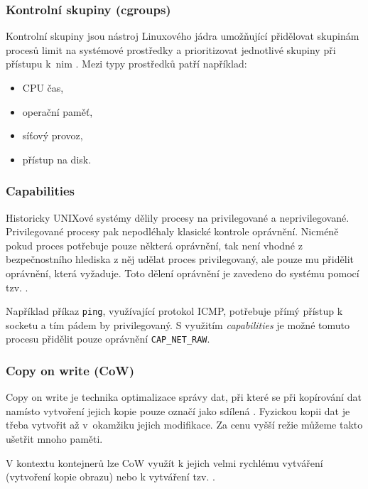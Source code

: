 \subsubsection{Kontrolní skupiny (cgroups)}

Kontrolní skupiny jsou nástroj Linuxového jádra umožňující přidělovat skupinám procesů limit na systémové prostředky a prioritizovat jednotlivé skupiny při přístupu k~nim \cite{cgroups}.
Mezi typy prostředků patří například:

\begin{itemize}
	\item CPU čas,
	\item operační paměť,
	\item síťový provoz,
	\item přístup na disk.
\end{itemize} %

\subsubsection{Capabilities}

Historicky UNIXové systémy dělily procesy na privilegované a neprivilegované.
Privilegované procesy pak nepodléhaly klasické kontrole oprávnění.
Nicméně pokud proces potřebuje pouze některá oprávnění, tak není vhodné z bezpečnostního hlediska z něj udělat proces privilegovaný, ale pouze mu přidělit oprávnění, která vyžaduje.
Toto dělení oprávnění je zavedeno do systému pomocí tzv.  \cite{capabilities}.

Například příkaz \verb|ping|, využívající protokol ICMP, potřebuje přímý přístup k socketu a tím pádem by privilegovaný.
S využitím \textit{capabilities} je možné tomuto procesu přidělit pouze oprávnění \verb|CAP_NET_RAW|.

\subsubsection{Copy on write (CoW)}

Copy on write je technika optimalizace správy dat, při které se při kopírování dat namísto vytvoření jejich kopie pouze označí jako sdílená \cite{cow}.
Fyzickou kopii dat je třeba vytvořit až v~okamžiku jejich modifikace.
Za cenu vyšší režie můžeme takto ušetřit mnoho paměti.

V kontextu kontejnerů lze CoW využít k jejich velmi rychlému vytváření (vytvoření kopie obrazu) nebo k vytváření tzv. .

